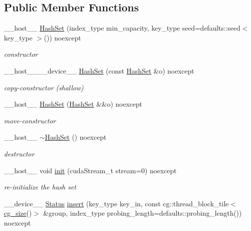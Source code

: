 \subsection*{Public Member Functions}
\begin{DoxyCompactItemize}
\item 
\+\_\+\+\_\+host\+\_\+\+\_\+ \hyperlink{classwarpcore_1_1HashSet_aff2bcd0720090d1dcfc03d0e7d9a1eab}{Hash\+Set} (index\+\_\+type min\+\_\+capacity, key\+\_\+type seed=defaults\+::seed$<$ key\+\_\+type $>$()) noexcept
\begin{DoxyCompactList}\small\item\em constructor \end{DoxyCompactList}\item 
\+\_\+\+\_\+host\+\_\+\+\_\+\+\_\+\+\_\+device\+\_\+\+\_\+ \hyperlink{classwarpcore_1_1HashSet_a4f3bde62cd45155bbc7eb5db38357f28}{Hash\+Set} (const \hyperlink{classwarpcore_1_1HashSet}{Hash\+Set} \&o) noexcept
\begin{DoxyCompactList}\small\item\em copy-\/constructor (shallow) \end{DoxyCompactList}\item 
\+\_\+\+\_\+host\+\_\+\+\_\+ \hyperlink{classwarpcore_1_1HashSet_a572b36003a5652fa6a28155b9a5b6e1d}{Hash\+Set} (\hyperlink{classwarpcore_1_1HashSet}{Hash\+Set} \&\&o) noexcept
\begin{DoxyCompactList}\small\item\em move-\/constructor \end{DoxyCompactList}\item 
\mbox{\label{classwarpcore_1_1HashSet_a5419d12a6675f108bcda8a03580ee67c}} 
\+\_\+\+\_\+host\+\_\+\+\_\+ \hyperlink{classwarpcore_1_1HashSet_a5419d12a6675f108bcda8a03580ee67c}{$\sim$\+Hash\+Set} () noexcept
\begin{DoxyCompactList}\small\item\em destructor \end{DoxyCompactList}\item 
\+\_\+\+\_\+host\+\_\+\+\_\+ void \hyperlink{classwarpcore_1_1HashSet_a3768b1e7daa39cff5bc2bcac38d51b2e}{init} (cuda\+Stream\+\_\+t stream=0) noexcept
\begin{DoxyCompactList}\small\item\em re-\/initialize the hash set \end{DoxyCompactList}\item 
\+\_\+\+\_\+device\+\_\+\+\_\+ \hyperlink{classwarpcore_1_1Status}{Status} \hyperlink{classwarpcore_1_1HashSet_af54d9aecfefb13e451e0580a38702f54}{insert} (key\+\_\+type key\+\_\+in, const cg\+::thread\+\_\+block\+\_\+tile$<$ \hyperlink{classwarpcore_1_1HashSet_a0906259ae0be4a4f6f9ba74b4874e542}{cg\+\_\+size}()$>$ \&group, index\+\_\+type probing\+\_\+length=defaults\+::probing\+\_\+length()) noexcept

\end{DoxyCompactItemize}
